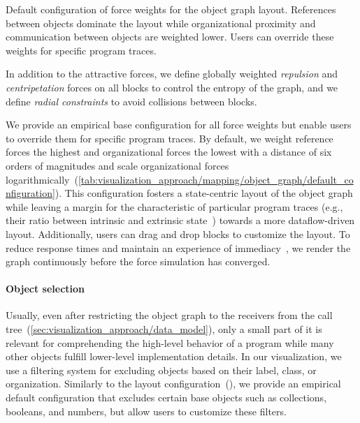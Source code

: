 \begin{table}
	\centering
	\caption{
		Default configuration of force weights for the object graph layout.
		References between objects dominate the layout while organizational proximity and communication between objects are weighted lower.
		Users can override these weights for specific program traces.
	}
	\label{tab:visualization_approach/mapping/object_graph/default_configuration}
	\begin{threeparttable}
		\centering
		{\footnotesize
		}
	\end{threeparttable}
\end{table}

In addition to the attractive forces, we define globally weighted \emph{repulsion} and \emph{centripetation} forces on all blocks to control the entropy of the graph, and we define \emph{radial constraints} to avoid collisions between blocks.

We provide an empirical base configuration for all force weights but enable users to override them for specific program traces.
By default, we weight reference forces the highest and organizational forces the lowest with a distance of six orders of magnitudes and scale organizational forces logarithmically~(\cref{tab:visualization_approach/mapping/object_graph/default_configuration}).
This configuration fosters a state-centric layout of the object graph while leaving a margin for the characteristic of particular program traces (e.g., their ratio between intrinsic and extrinsic state~\cite[p. 218ff]{gamma1994design}) towards a more dataflow-driven layout.
Additionally, users can drag and drop blocks to customize the layout.
To reduce response times and maintain an experience of immediacy~\cites[chap. 11]{shneiderman2005designing}{ungar1997debugging}, we render the graph continuously before the force simulation has converged.

\paragraph{Object selection}
\label{sec:visualization_approach/mapping/object_selection}

Usually, even after restricting the object graph to the receivers from the call tree~(\cref{sec:visualization_approach/data_model}), only a small part of it is relevant for comprehending the high-level behavior of a program while many other objects fulfill lower-level implementation details.
In our visualization, we use a filtering system for excluding objects based on their label, class, or organization.
Similarly to the layout configuration~(), we provide an empirical default configuration that excludes certain base objects such as collections, booleans, and numbers, but allow users to customize these filters.

